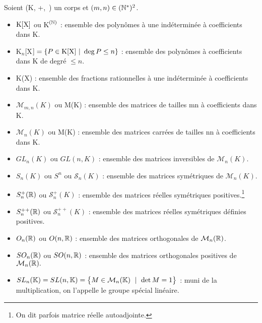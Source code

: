 \vspace{1.3cm}

Soient (K, +,\ \x) un corps et \((m,n)\in (\mathbb{N}^*)^2\).
\begin{itemize}[leftmargin=0cm,label=•]
    \item $\text{K}[\text{X}]$ ou K\(^{(\mathbb{N})}\) : ensemble des polynômes à une indéterminée à coefficients dans K.
    
    \item K\(_n [ \)X\(] =\{ P\in \text{K}[\text{X}] \ | \ \deg P\leq n\} \) : ensemble des polynômes à coefficients dans K de degré \(\leq n\).
    
    \item K(X) : ensemble des fractions rationnelles à une indéterminée à coefficients dans K.
    
    \item \(\mathcal{M}_{m,n}(K)\) ou M(K) : ensemble des matrices de tailles m\x n à coefficients dans K. 
    
    \item \(\mathcal{M}_n(K)\) ou M(K) : ensemble des matrices carrées de tailles n\x n à coefficients dans K. 
    
    \item \(GL_n(K)\) ou \(GL(n,K)\) : ensemble des matrices inversibles de \(\mathcal{M}_n(K)\).
    
    \item \(S_n(K)\) ou \(S^n\) ou \(\mathscr{S}_n(K)\) : ensemble des matrices symétriques de \(\mathcal{M}_n(K).\)
    
    \item \(S_n^+(\mathbb{R})\) ou \(\mathscr{S}_n^+(K)\) : ensemble des matrices réelles symétriques positives.\footnote{On dit parfois matrice réelle autoadjointe.}
    
    \item \(S_n^{++}(\mathbb{R})\) ou \(\mathscr{S}_n^{++}(K)\) : ensemble des matrices réelles symétriques définies positives.
    
    \item \(O_n(\mathbb{R})\) ou \(O(n,\mathbb{R})\) : ensemble des matrices orthogonales de \(\mathcal{M}_n(\mathbb{R})\).
    
    \item \(SO_n(\mathbb{R})\) ou \(SO(n,\mathbb{R})\) : ensemble des matrices orthogonales positives de \(\mathcal{M}_n(\mathbb{R}).\)
    
    \item \(SL_n(\KK)=SL(n,\KK)=\bigl\{M\in\mathcal{M}_n(\KK) \ \mid \ \det M=1\bigr\}\) : muni de la multiplication, on l'appelle le groupe spécial linéaire.
    

\end{itemize}

